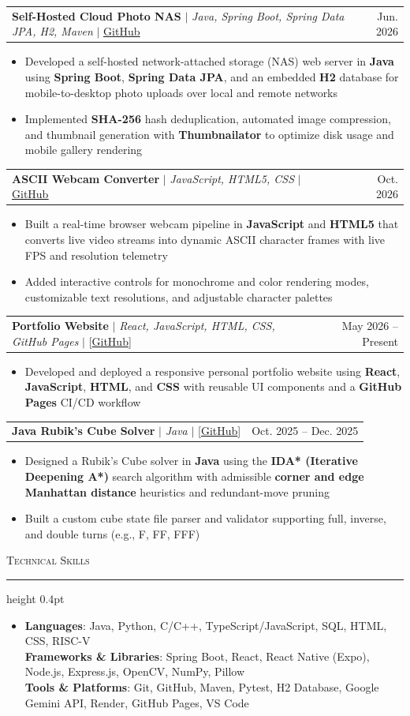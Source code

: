 \documentclass[letterpaper,11pt]{article}
\makeatletter
\newcommand{\resumesection}[1]{%
  \vspace{4pt}%
  {\large\scshape #1}\vspace{1.5pt}%
  \hrule height 0.4pt%
  \vspace{3pt}%
}
\newcommand{\resumeProjectHeading}[2]{%
  \vspace{1.5pt}%
  \noindent\begin{tabular*}{\textwidth}{@{\extracolsep{\fill}}l r@{}}
    \small #1 & \small #2 \\
  \end{tabular*}\vspace{-4pt}%
}
\newcommand{\resumeItemListStart}{%
  \begin{itemize}%
    \setlength{\itemsep}{0.5pt}%
    \setlength{\parskip}{0pt}%
    \setlength{\parsep}{0pt}%
    \setlength{\topsep}{1.5pt}%
}
\newcommand{\resumeItemListEnd}{\end{itemize}\vspace{-3pt}}
\newcommand{\resumeItem}[1]{%
  \item\small{#1}%
}
\makeatother
\begin{document}
\resumeProjectHeading
  {\textbf{Self-Hosted Cloud Photo NAS} $|$ \emph{Java, Spring Boot, Spring Data JPA, H2, Maven} $|$ \href{https://github.com/kerwinmok/NAS-storage}{\underline{GitHub}}}{Jun. 2026}
\resumeItemListStart
  \resumeItem{Developed a self-hosted network-attached storage (NAS) web server in \textbf{Java} using \textbf{Spring Boot}, \textbf{Spring Data JPA}, and an embedded \textbf{H2} database for mobile-to-desktop photo uploads over local and remote networks}
  \resumeItem{Implemented \textbf{SHA-256} hash deduplication, automated image compression, and thumbnail generation with \textbf{Thumbnailator} to optimize disk usage and mobile gallery rendering}
\resumeItemListEnd

\resumeProjectHeading
  {\textbf{ASCII Webcam Converter} $|$ \emph{JavaScript, HTML5, CSS} $|$ \href{https://github.com/kerwinmok/ascii-cam}{\underline{GitHub}}}{Oct. 2026}
\resumeItemListStart
  \resumeItem{Built a real-time browser webcam pipeline in \textbf{JavaScript} and \textbf{HTML5} that converts live video streams into dynamic ASCII character frames with live FPS and resolution telemetry}
  \resumeItem{Added interactive controls for monochrome and color rendering modes, customizable text resolutions, and adjustable character palettes}
\resumeItemListEnd

\resumeProjectHeading
  {\textbf{Portfolio Website} $|$ \emph{React, JavaScript, HTML, CSS, GitHub Pages} $|$ [\underline{GitHub}]}{May 2026 -- Present}
\resumeItemListStart
  \resumeItem{Developed and deployed a responsive personal portfolio website using \textbf{React}, \textbf{JavaScript}, \textbf{HTML}, and \textbf{CSS} with reusable UI components and a \textbf{GitHub Pages} CI/CD workflow}
\resumeItemListEnd

\resumeProjectHeading
  {\textbf{Java Rubik's Cube Solver} $|$ \emph{Java} $|$ [\underline{GitHub}]}{Oct. 2025 -- Dec. 2025}
\resumeItemListStart
  \resumeItem{Designed a Rubik's Cube solver in \textbf{Java} using the \textbf{IDA* (Iterative Deepening A*)} search algorithm with admissible \textbf{corner and edge Manhattan distance} heuristics and redundant-move pruning}
  \resumeItem{Built a custom cube state file parser and validator supporting full, inverse, and double turns (e.g., F, FF, FFF)}
\resumeItemListEnd

\resumesection{Technical Skills}
\begin{itemize}
  \setlength{\itemsep}{0.5pt}
  \setlength{\parskip}{0pt}
  \setlength{\parsep}{0pt}
  \item[] \small{
    \textbf{Languages}{: Java, Python, C/C++, TypeScript/JavaScript, SQL, HTML, CSS, RISC-V} \\
    \textbf{Frameworks \& Libraries}{: Spring Boot, React, React Native (Expo), Node.js, Express.js, OpenCV, NumPy, Pillow} \\
    \textbf{Tools \& Platforms}{: Git, GitHub, Maven, Pytest, H2 Database, Google Gemini API, Render, GitHub Pages, VS Code}
  }
\end{itemize}
\end{document}
